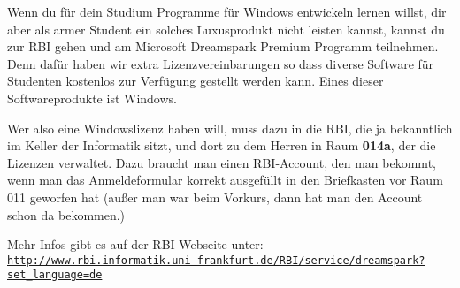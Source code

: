 \spaltenanfang
Wenn du f\"ur dein Studium Programme f\"ur Windows entwickeln lernen willst,
dir aber als armer Student ein solches Luxusprodukt nicht leisten kannst,
kannst du zur RBI gehen und am Microsoft Dreamspark Premium Programm
teilnehmen. Denn daf\"ur haben wir extra Lizenzvereinbarungen so dass diverse
Software f\"ur Studenten kostenlos zur Verf\"ugung gestellt werden kann.
Eines dieser Softwareprodukte ist Windows.

Wer also eine Windowslizenz haben will, muss dazu in die RBI, die ja bekanntlich im Keller der Informatik sitzt,
und dort zu dem Herren in Raum \textbf{014a}, der die Lizenzen verwaltet. Dazu
braucht man einen RBI-Account, den man bekommt, wenn man das Anmeldeformular
korrekt ausgef\"ullt in den Briefkasten vor Raum 011 geworfen hat (au{\ss}er
man war beim Vorkurs, dann hat man den Account schon da bekommen.)

Mehr Infos gibt es auf der RBI Webseite unter: \texttt{\url{http://www.rbi.informatik.uni-frankfurt.de/RBI/service/dreamspark?set_language=de}}


\spaltenende

